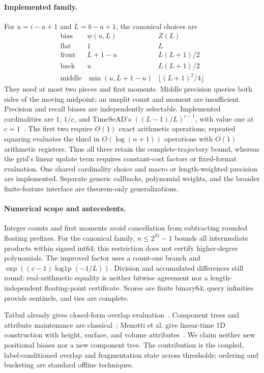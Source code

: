 \paragraph{Implemented family.}
For $u=i-a+1$ and $L=b-a+1$, the canonical choices are
\[
\begin{array}{c|c|c}
\text{bias}&w(u,L)&Z(L)\\\hline
\text{flat}&1&L\\
\text{front}&L+1-u&L(L+1)/2\\
\text{back}&u&L(L+1)/2\\
\text{middle}&\min(u,L+1-u)&\lfloor(L+1)^2/4\rfloor
\end{array}
\]
They need at most two pieces and first moments. Middle precision queries
both sides of the moving midpoint; an unsplit count and moment are
insufficient. Precision and recall biases are independently selectable.
Implemented cardinalities are $1$, $1/c$, and TimeSeAD's
$((L-1)/L)^{c-1}$, with value one at $c=1$~\cite{wagner2023timesead}.
The first two require $O(1)$ exact arithmetic operations; repeated squaring
evaluates the third in $O(\log(n+1))$ operations with $O(1)$ arithmetic registers.
Thus all three retain the complete-trajectory bound, whereas the grid's
linear update term requires constant-cost factors or fixed-format evaluation.
One shared cardinality choice and macro or length-weighted precision are
implemented. Separate generic callbacks, polynomial weights, and the broader
finite-feature interface are theorem-only generalizations.

\paragraph{Numerical scope and antecedents.}
Integer counts and first moments avoid cancellation from subtracting rounded
floating prefixes. For the canonical family, $n\leq2^{31}-1$ bounds all
intermediate products within signed int64; this restriction does not certify
higher-degree polynomials. The improved factor uses a count-one branch and
$\exp((c-1)\operatorname{log1p}(-1/L))$. Division and accumulated differences
still round: real-arithmetic equality is neither bitwise agreement nor a
length-independent floating-point certificate. Scores are finite binary64;
query infinities provide sentinels, and ties are complete.

Tatbul already gives closed-form overlap evaluation~\cite{tatbul2018}.
Component trees and attribute maintenance are classical~\cite{najman2006};
Menotti et al. give linear-time 1D construction with height, surface, and
volume attributes~\cite{menotti2007}. We claim neither new positional biases
nor a new component tree. The contribution is the coupled, label-conditioned
overlap and fragmentation state across thresholds; ordering and bucketing
are standard offline techniques.
